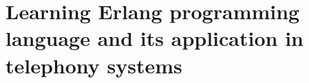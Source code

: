 \chapter{Learning Erlang programming language and its application in telephony systems}
\label{ch:erlang}

